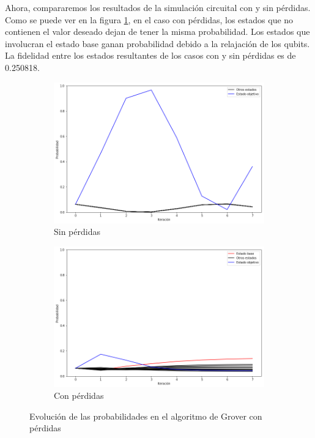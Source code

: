 Ahora, compararemos los resultados de la simulación circuital con y sin pérdidas. Como se puede ver en la figura \ref{fig:groverlosscomp}, en el caso con pérdidas, los estados que no contienen el valor deseado dejan de tener la misma probabilidad. Los estados que involucran el estado base ganan probabilidad debido a la relajación de los qubits. La fidelidad entre los estados resultantes de los casos con y sin pérdidas es de 0.250818.

\begin{figure}[H]
    \centering
    \begin{subfigure}[m]{0.49\textwidth}
        \centering
        \includegraphics[width=0.99\linewidth]{img/groveralllossless.png}
        \caption{Sin pérdidas}
    \end{subfigure}
    \begin{subfigure}[m]{0.49\textwidth}
        \centering
        \includegraphics[width=0.99\linewidth]{img/groverallloss.png}
        \caption{Con pérdidas}
    \end{subfigure}
    \caption[Evolución de las probabilidades en el algoritmo de Grover con pérdidas]{Evolución de las probabilidades en el algoritmo de Grover con pérdidas}
    \label{fig:groverlosscomp}
\end{figure}

